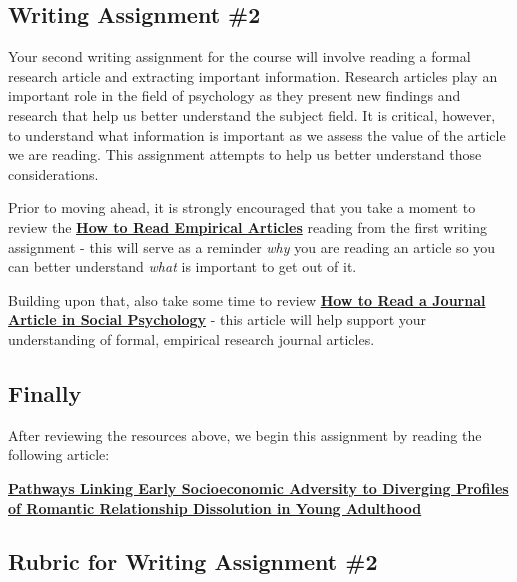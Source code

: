\documentclass[
]{book}
\begin{document}
\begin{assessment}
\hypertarget{writing-assignment-2}{%
\section{Writing Assignment \#2}\label{writing-assignment-2}}

Your second writing assignment for the course will involve reading a formal research article and extracting important information. Research articles play an important role in the field of psychology as they present new findings and research that help us better understand the subject field. It is critical, however, to understand what information is important as we assess the value of the article we are reading. This assignment attempts to help us better understand those considerations.

Prior to moving ahead, it is strongly encouraged that you take a moment to review the \href{assets/unit_9/Assessment_Empirical_Short.pdf}{\textbf{How to Read Empirical Articles}} reading from the first writing assignment - this will serve as a reminder \emph{why} you are reading an article so you can better understand \emph{what} is important to get out of it.

Building upon that, also take some time to review \href{assets/unit_9/Assessment_Empirical_Long.pdf}{\textbf{How to Read a Journal Article in Social Psychology}} - this article will help support your understanding of formal, empirical research journal articles.

\hypertarget{finally}{%
\subsection*{Finally}\label{finally}}

After reviewing the resources above, we begin this assignment by reading the following article:

\href{assets/unit_9/Romantic_Relationship_Dissolution_in_Young_Adulthood.pdf}{\textbf{Pathways Linking Early Socioeconomic Adversity to Diverging Profiles of Romantic Relationship Dissolution in Young Adulthood}}

\hypertarget{rubric-for-writing-assignment-2}{%
\subsection*{Rubric for Writing Assignment \#2}\label{rubric-for-writing-assignment-2}}


\end{assessment}
\end{document}
